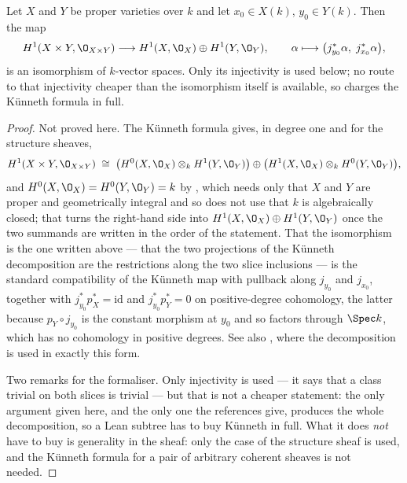 \begin{proposition}\label{prop:cube-kunneth-h1}
Let $X$ and $Y$ be proper varieties over $k$ and let $x_0\in X(k)$,
$y_0\in Y(k)$.  Then the map
\[
  H^1(X\times Y,\O_{X\times Y})\longrightarrow
  H^1(X,\O_X)\oplus H^1(Y,\O_Y),\qquad
  \alpha\longmapsto\bigl(j_{y_0}^*\alpha,\;j_{x_0}^*\alpha\bigr),
\]
is an isomorphism of $k$-vector spaces.  Only its injectivity is used below;
no route to that injectivity cheaper than the isomorphism itself is available,
so  charges the K\"unneth formula in full.
\end{proposition}
\begin{proof}
Not proved here.  The K\"unneth formula  gives, in degree
one and for the structure sheaves,
\[
  H^1(X\times Y,\O_{X\times Y})\;\cong\;
  \bigl(H^0(X,\O_X)\otimes_kH^1(Y,\O_Y)\bigr)\oplus
  \bigl(H^1(X,\O_X)\otimes_kH^0(Y,\O_Y)\bigr),
\]
and $H^0(X,\O_X)=H^0(Y,\O_Y)=k$ by ,
which needs only that $X$ and $Y$ are proper and geometrically integral and so
does not use that $k$ is algebraically closed; that turns the right-hand side
into $H^1(X,\O_X)\oplus H^1(Y,\O_Y)$ once the two summands are written in the
order of the statement.  That the
isomorphism is the one written above --- that the two projections of the
K\"unneth decomposition are the restrictions along the two slice inclusions ---
is the standard compatibility of the K\"unneth map with pullback along
$j_{y_0}$ and $j_{x_0}$, together with $j_{y_0}^*p_X^*=\mathrm{id}$ and
$j_{y_0}^*p_Y^*=0$ on positive-degree cohomology, the latter because
$p_Y\circ j_{y_0}$ is the constant morphism at $y_0$ and so factors through
$\Spec k$, which has no cohomology in positive degrees.  See also
\cite[\S6]{MumfordAbelianVarieties}, where the decomposition is used in exactly
this form.

Two remarks for the formaliser.  Only injectivity is used --- it says that a
class trivial on both slices is trivial --- but that is not a cheaper
statement: the only argument given here, and the only one the references give,
produces the whole decomposition, so a Lean subtree has to buy K\"unneth in
full.  What it does \emph{not} have to buy is generality in the sheaf: only
the case of the structure sheaf is used, and the K\"unneth formula for a pair
of arbitrary coherent sheaves is not needed.
\end{proof}

